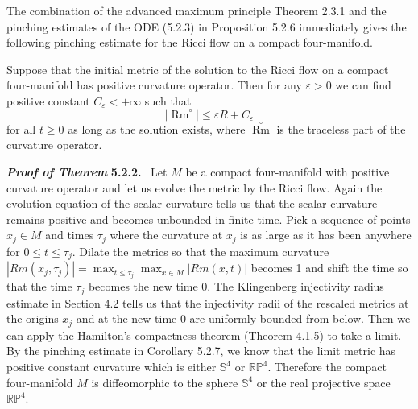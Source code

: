 The combination of the advanced maximum principle Theorem 2.3.1
and the pinching estimates of the ODE (5.2.3) in Proposition 5.2.6
immediately gives the following pinching estimate for the Ricci
flow on a compact four-manifold.

\begin{corollary} 
  \label{cor:cz-four-dimensional-curvature-operator-roundness}

Suppose that the initial metric of the solution to the Ricci flow
on a compact four-manifold has positive curvature operator. Then
for any $\varepsilon>0$ we can find positive constant
$C_\varepsilon<+\infty$ such that
$$
|{\mathop{Rm}^ \circ}|\le\varepsilon R+C_\varepsilon
$$
for all $t\ge 0$ as long as the solution exists, where ${\mathop
{Rm}\limits^ \circ}$ is the traceless part of the curvature
operator.
\end{corollary}

\smallskip
{\bf\em Proof of Theorem} {\bf 5.2.2.} \ Let $M$ be a compact
four-manifold with positive curvature operator and let us evolve
the metric by the Ricci flow. Again the evolution equation of the
scalar curvature tells us that the scalar curvature remains
positive and becomes unbounded in finite time. Pick a sequence of
points $x_j\in M$ and times $\tau_j$ where the curvature at $x_j$
is as large as it has been anywhere for $0\le t\le \tau_j$. Dilate
the metrics so that the maximum curvature
$|Rm(x_j,\tau_j)|=\max_{t\le\tau_j}\max_{x\in M}|Rm(x,t)|$ becomes
1 and shift the time so that the time $\tau_j$ becomes the new
time 0. The Klingenberg injectivity radius estimate in Section 4.2
tells us that the injectivity radii of the rescaled metrics at the
origins $x_j$ and at the new time 0 are uniformly bounded from
below. Then we can apply the Hamilton's compactness theorem
(Theorem 4.1.5) to take a limit. By the pinching estimate in
Corollary 5.2.7, we know that the limit metric has positive
constant curvature which is either $\mathbb{S}^4$ or
$\mathbb{R}\mathbb{P}^4$. Therefore the compact four-manifold $M$
is diffeomorphic to the sphere $\mathbb{S}^4$ or the real
projective space $\mathbb{R}\mathbb{P}^4$.
\endproof

